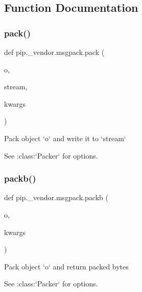 \subsection{Function Documentation}
\mbox{\label{namespacepip_1_1__vendor_1_1msgpack_a18894bccffe8100e5b40292e084b3f70}} 
\subsubsection{\texorpdfstring{pack()}{pack()}}
{\footnotesize\ttfamily def pip.\+\_\+vendor.\+msgpack.\+pack (\begin{DoxyParamCaption}\item[{}]{o,  }\item[{}]{stream,  }\item[{}]{kwargs }\end{DoxyParamCaption})}

\begin{DoxyVerb}Pack object `o` and write it to `stream`

See :class:`Packer` for options.
\end{DoxyVerb}
 \mbox{\label{namespacepip_1_1__vendor_1_1msgpack_a185e16c7e8d0315d9646129bfdae88de}} 
\subsubsection{\texorpdfstring{packb()}{packb()}}
{\footnotesize\ttfamily def pip.\+\_\+vendor.\+msgpack.\+packb (\begin{DoxyParamCaption}\item[{}]{o,  }\item[{}]{kwargs }\end{DoxyParamCaption})}

\begin{DoxyVerb}Pack object `o` and return packed bytes

See :class:`Packer` for options.
\end{DoxyVerb}
 \mbox{\label{namespacepip_1_1__vendor_1_1msgpack_ae5f486d414a6a00cec8c347726fffc42}} 
